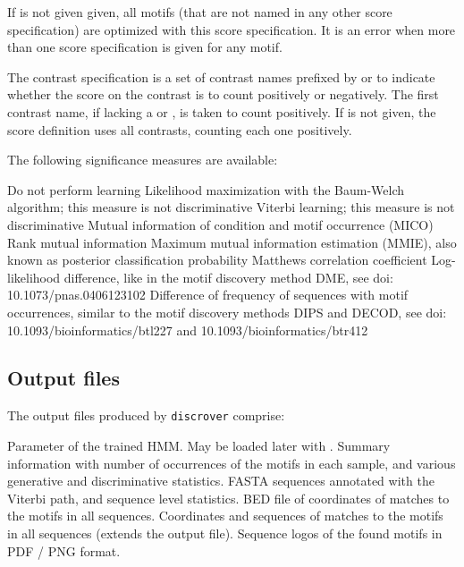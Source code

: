 \documentclass[a4paper]{article}
\newcommand{\discrover}[0]{\texttt{discrover}}
\begin{document}
If  is not given given, all motifs (that are not named in any other score specification) are optimized with this score specification.
It is an error when more than one score specification is given for any motif.

The contrast specification  is a set of contrast names prefixed by \Q{+} or \Q{-} to indicate whether the score on the contrast is to count positively or negatively.
The first contrast name, if lacking a \Q{+} or \Q{-}, is taken to count positively.
If  is not given, the score definition uses all contrasts, counting each one positively.

The following significance measures are available:

\begin{description}
    Do not perform learning
    Likelihood maximization with the Baum-Welch algorithm; this measure is not discriminative
    Viterbi learning; this measure is not discriminative
    Mutual information of condition and motif occurrence (MICO)
    Rank mutual information
    Maximum mutual information estimation (MMIE), also known as posterior classification probability
    Matthews correlation coefficient
    Log-likelihood difference, like in the motif discovery method DME, see doi: 10.1073/pnas.0406123102
    Difference of frequency of sequences with motif occurrences, similar to the motif discovery methods DIPS and DECOD, see doi: 10.1093/bioinformatics/btl227 and 10.1093/bioinformatics/btr412
\end{description}

\subsection{Output files}
The output files produced by \discrover{} comprise:

\begin{description}
    Parameter of the trained HMM\@.
    May be loaded later with .
    Summary information with number of occurrences of the motifs in each sample, and various generative and discriminative statistics.
    FASTA sequences annotated with the Viterbi path, and sequence level statistics.
    BED file of coordinates of matches to the motifs in all sequences.
    Coordinates and sequences of matches to the motifs in all sequences (extends the  output file).
    Sequence logos of the found motifs in PDF / PNG format.
\end{description}
\end{document}
